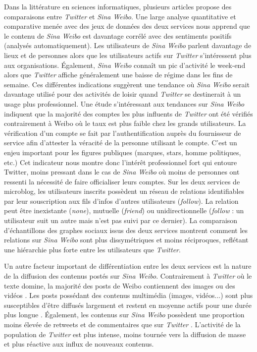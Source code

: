 Dans la littérature en sciences informatiques, plusieurs articles propose des comparaisons entre \textit{Twitter} et \textit{Sina Weibo}. Une large analyse quantitative et comparative menée avec des jeux de données des deux services \citep{Qial2012} nous apprend que le contenu de \textit{Sina Weibo} est davantage corrélé avec des sentiments positifs (analysés automatiquement). Les utilisateurs de \textit{Sina Weibo} parlent davantage de lieux et de personnes alors que les utilisateurs actifs sur \textit{Twitter} s’intéressent plus aux organisations. Également, \textit{Sina Weibo} connaît un pic d’activité le week-end alors que \textit{Twitter} affiche généralement une baisse de régime dans les fins de semaine. Ces différentes indications suggèrent une tendance où \textit{Sina Weibo} serait davantage utilisé pour des activités de loisir quand \textit{Twitter} se destinerait à un usage plus professionnel. Une étude s’intéressant aux tendances sur \textit{Sina Weibo} \citep{Lial2013} indiquent que la majorité des comptes les plus influents de \textit{Twitter} ont été vérifiés contrairement à Weibo où le taux est plus faible chez les grands utilisateurs. La vérification d’un compte se fait par l’authentification auprès du fournisseur de service afin d’attester la véracité de la personne utilisant le compte. C’est un enjeu important pour les figures publiques (marques, stars, homme politiques, etc.) Cet indicateur nous montre donc l’intérêt professionnel fort qui entoure Twitter, moins pressant dans le cas de \textit{Sina Weibo} où moins de personnes ont ressenti la nécessité de faire officialiser leurs comptes. Sur les deux services de microblog, les utilisateurs inscrits possèdent un réseau de relations identifiables par leur souscription aux fils d’infos d’autres utilisateurs (\textit{follow}). La relation peut être inexistante (\textit{none}), mutuelle (\textit{friend}) ou unidirectionnelle (\textit{follow} : un utilisateur suit un autre mais n’est pas suivi par ce dernier). La comparaison d’échantillons des graphes sociaux issus des deux services \citep{Chenal2012} montrent comment les relations sur \textit{Sina Weibo} sont plus dissymétriques et moins réciproques, reflétant une hiérarchie plus forte entre les utilisateurs que \textit{Twitter}. 

Un autre facteur important de différentiation entre les deux services est la nature de la diffusion des contenus postés sur \textit{Sina Weibo}. Contrairement à \textit{Twitter} où le texte domine, la majorité des posts de Weibo contiennent des images ou des vidéos \citep{Zhao2012}. Les posts possédant des contenus multimédia (images, vidéos...) sont plus susceptibles d’être diffusés largement et restent en moyenne actifs pour une durée plus longue \citep{Zhao2012}. Également, les contenus sur \textit{Sina Weibo} possèdent une proportion moins élevée de retweets et de commentaires que sur \textit{Twitter} \citep{Zhao2012, Gao2012}. L’activité de la population de \textit{Twitter} est plus intense, moins tournée vers la diffusion de masse et plus réactive aux influx de nouveaux contenus. 

